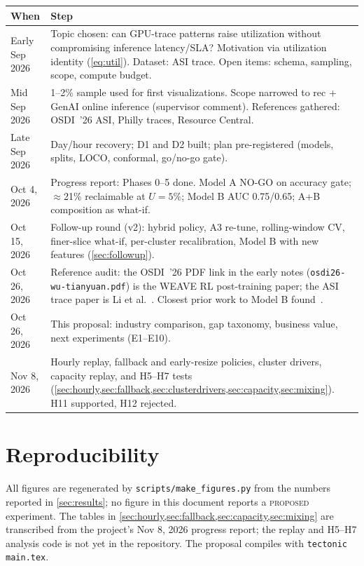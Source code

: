 \documentclass[11pt]{article}
\newcommand{\status}[1]{\textsc{#1}}
\begin{document}
\begin{table}[H]
\centering\small
\begin{tabularx}{\linewidth}{@{}p{2.4cm}L@{}}
\toprule
When & Step \\
\midrule
Early Sep 2026 & Topic chosen: can GPU-trace patterns raise utilization without compromising inference latency/SLA? Motivation via utilization identity (\cref{eq:util}). Dataset: ASI trace. Open items: schema, sampling, scope, compute budget. \\
Mid Sep 2026 & 1--2\% sample used for first visualizations. Scope narrowed to rec + GenAI online inference (supervisor comment). References gathered: OSDI~'26 ASI, Philly traces, Resource Central. \\
Late Sep 2026 & Day/hour recovery; D1 and D2 built; plan pre-registered (models, splits, LOCO, conformal, go/no-go gate). \\
Oct 4, 2026 & Progress report: Phases 0--5 done. Model A NO-GO on accuracy gate; $\approx$21\% reclaimable at $U=5\%$; Model B AUC 0.75/0.65; A+B composition as what-if. \\
Oct 15, 2026 & Follow-up round (v2): hybrid policy, A3 re-tune, rolling-window CV, finer-slice what-if, per-cluster recalibration, Model B with new features (\cref{sec:followup}). \\
Oct 26, 2026 & Reference audit: the OSDI~'26 PDF link in the early notes (\texttt{osdi26-wu-tianyuan.pdf}) is the WEAVE RL post-training paper; the ASI trace paper is Li et al.~\cite{li2026asi}. Closest prior work to Model B found~\cite{zhang2026ineffective}. \\
Oct 26, 2026 & This proposal: industry comparison, gap taxonomy, business value, next experiments (E1--E10). \\
Nov 8, 2026 & Hourly replay, fallback and early-resize policies, cluster drivers, capacity replay, and H5--H7 tests (\cref{sec:hourly,sec:fallback,sec:clusterdrivers,sec:capacity,sec:mixing}). H11 supported, H12 rejected. \\
\bottomrule
\end{tabularx}
\end{table}

\section{Reproducibility}
All figures are regenerated by \texttt{scripts/make\_figures.py} from the numbers reported in \cref{sec:results}; no figure in this document reports a \status{proposed} experiment. The tables in \cref{sec:hourly,sec:fallback,sec:capacity,sec:mixing} are transcribed from the project's Nov 8, 2026 progress report; the replay and H5--H7 analysis code is not yet in the repository. The proposal compiles with \texttt{tectonic main.tex}.
\end{document}
